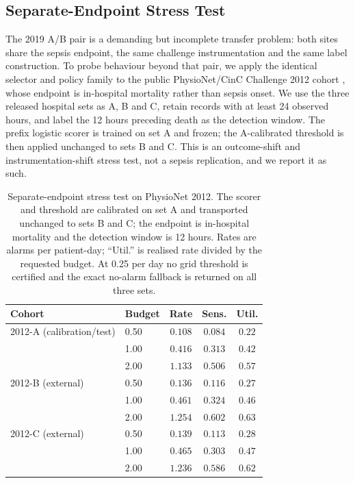 \subsection{Separate-Endpoint Stress Test}
\label{sec:external2012}

The 2019 A/B pair is a demanding but incomplete transfer problem: both sites share the sepsis endpoint, the same challenge instrumentation and the same label construction. To probe behaviour beyond that pair, we apply the identical selector and policy family to the public PhysioNet/CinC Challenge 2012 cohort \citep{silva2012predicting}, whose endpoint is in-hospital mortality rather than sepsis onset. We use the three released hospital sets as A, B and C, retain records with at least 24 observed hours, and label the 12 hours preceding death as the detection window. The prefix logistic scorer is trained on set A and frozen; the A-calibrated threshold is then applied unchanged to sets B and C. This is an outcome-shift and instrumentation-shift stress test, not a sepsis replication, and we report it as such.

\begin{table}[tb]
\centering
\caption{Separate-endpoint stress test on PhysioNet 2012. The scorer and threshold are calibrated on set A and transported unchanged to sets B and C; the endpoint is in-hospital mortality and the detection window is 12 hours. Rates are alarms per patient-day; ``Util.'' is realised rate divided by the requested budget. At 0.25 per day no grid threshold is certified and the exact no-alarm fallback is returned on all three sets.}
\label{tab:external2012}
\small
\begin{tabular}{llccc}
\toprule
Cohort & Budget & Rate & Sens. & Util. \\
\midrule
2012-A (calibration/test) & 0.50 & $0.108$ & $0.084$ & $0.22$ \\
 & 1.00 & $0.416$ & $0.313$ & $0.42$ \\
 & 2.00 & $1.133$ & $0.506$ & $0.57$ \\
\midrule
2012-B (external) & 0.50 & $0.136$ & $0.116$ & $0.27$ \\
 & 1.00 & $0.461$ & $0.324$ & $0.46$ \\
 & 2.00 & $1.254$ & $0.602$ & $0.63$ \\
\midrule
2012-C (external) & 0.50 & $0.139$ & $0.113$ & $0.28$ \\
 & 1.00 & $0.465$ & $0.303$ & $0.47$ \\
 & 2.00 & $1.236$ & $0.586$ & $0.62$ \\
\bottomrule
\end{tabular}
\end{table}

